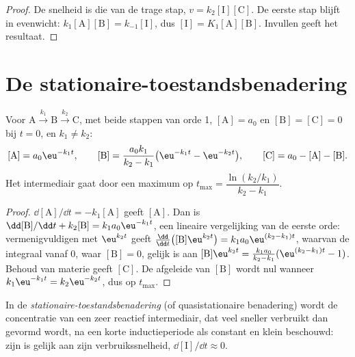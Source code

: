 \begin{proof}
De snelheid is die van de trage stap, $v = k_2[\mathrm{I}][\mathrm{C}]$.
De eerste stap blijft in evenwicht: $k_1[\mathrm{A}][\mathrm{B}] =
k_{-1}[\mathrm{I}]$, dus $[\mathrm{I}] = K_1[\mathrm{A}][\mathrm{B}]$.
Invullen geeft het resultaat.
\end{proof}

\section{De stationaire-toestandsbenadering}

\begin{theorem}\label{thm:b1:elementary-steps:consecutive}
Voor $\mathrm{A} \xrightarrow{k_1} \mathrm{B} \xrightarrow{k_2} \mathrm{C}$,
met beide stappen van orde 1, $[\mathrm{A}] = a_0$ en $[\mathrm{B}] =
[\mathrm{C}] = 0$ bij $t = 0$, en $k_1 \ne k_2$:
\[
  [\mathrm{A}] = a_0\eu^{-k_1t}, \qquad
  [\mathrm{B}] = \frac{a_0k_1}{k_2 - k_1}\big(\eu^{-k_1t} - \eu^{-k_2t}\big),
  \qquad [\mathrm{C}] = a_0 - [\mathrm{A}] - [\mathrm{B}] .
\]
Het intermediair gaat door een maximum op $t_{\max} = \dfrac{\ln(k_2/k_1)}
{k_2 - k_1}$.
\end{theorem}

\begin{proof}
$\dd[\mathrm{A}]/\dd t = -k_1[\mathrm{A}]$ geeft $[\mathrm{A}]$. Dan is
$\dd[\mathrm{B}]/\dd t + k_2[\mathrm{B}] = k_1a_0\eu^{-k_1t}$, een
lineaire vergelijking van de eerste orde: vermenigvuldigen met
$\eu^{k_2t}$ geeft $\frac{\dd}{\dd t}
\big([\mathrm{B}]\eu^{k_2t}\big) = k_1a_0\eu^{(k_2-k_1)t}$, waarvan de
integraal vanaf 0, waar $[\mathrm{B}] = 0$, gelijk is aan $[\mathrm{B}]\eu^{k_2t} =
\frac{k_1a_0}{k_2-k_1}(\eu^{(k_2-k_1)t} - 1)$. Behoud van materie geeft
$[\mathrm{C}]$. De afgeleide van $[\mathrm{B}]$ wordt nul wanneer $k_1\eu^{-k_1t}
= k_2\eu^{-k_2t}$, dus op $t_{\max}$.
\end{proof}

\begin{definition}\label{def:b1:elementary-steps:qssa}
In de \emph{stationaire-toestandsbenadering}
(of quasistationaire benadering) wordt de concentratie van een zeer
reactief intermediair, dat veel sneller verbruikt dan gevormd wordt, na
een korte inductieperiode als constant en klein beschouwd: zijn
 is gelijk aan zijn verbruikssnelheid,
$\dd[\mathrm{I}]/\dd t \approx 0$.
\end{definition}

